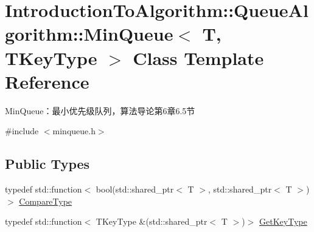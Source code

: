 \hypertarget{class_introduction_to_algorithm_1_1_queue_algorithm_1_1_min_queue}{}\section{Introduction\+To\+Algorithm\+:\+:Queue\+Algorithm\+:\+:Min\+Queue$<$ T, T\+Key\+Type $>$ Class Template Reference}
\label{class_introduction_to_algorithm_1_1_queue_algorithm_1_1_min_queue}


Min\+Queue：最小优先级队列，算法导论第6章6.5节  




{\ttfamily \#include $<$minqueue.\+h$>$}

\subsection*{Public Types}
\begin{DoxyCompactItemize}
\item 
typedef std\+::function$<$ bool(std\+::shared\+\_\+ptr$<$ T $>$, std\+::shared\+\_\+ptr$<$ T $>$)$>$ \hyperlink{class_introduction_to_algorithm_1_1_queue_algorithm_1_1_min_queue_a8f2f5b5d2b7097bbc6edda7b9c9228a6}{Compare\+Type}
\item 
typedef std\+::function$<$ T\+Key\+Type \&(std\+::shared\+\_\+ptr$<$ T $>$)$>$ \hyperlink{class_introduction_to_algorithm_1_1_queue_algorithm_1_1_min_queue_a391cb754ab172d1d4cdefd34130b917c}{Get\+Key\+Type}
\end{DoxyCompactItemize}

